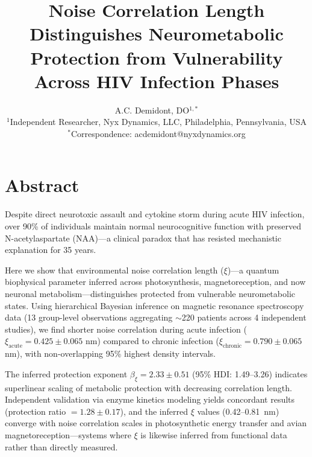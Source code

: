 \documentclass[10pt,a4paper]{article}
\makeatletter
\renewcommand{\maketitle}{
  \begin{center}
    {\LARGE\bfseries\@title\par}
    \vspace{1em}
    {\large\@author\par}
    \vspace{0.5em}
    {\small\@date\par}
  \end{center}
  \vspace{1em}
}
\makeatother
\begin{document}
\title{Noise Correlation Length Distinguishes Neurometabolic Protection from Vulnerability Across HIV Infection Phases}

\author{
A.C. Demidont, DO$^{1,*}$\\[0.5em]
{\small $^1$Independent Researcher, Nyx Dynamics, LLC, Philadelphia, Pennsylvania, USA}\\
{\small $^*$Correspondence: acdemidont@nyxdynamics.org}
}

\date{}

\maketitle

\section*{Abstract}

Despite direct neurotoxic assault and cytokine storm during acute HIV infection, over 90\% of individuals maintain normal neurocognitive function with preserved N-acetylaspartate (NAA)---a clinical paradox that has resisted mechanistic explanation for 35 years.

Here we show that environmental noise correlation length ($\xi$)---a quantum biophysical parameter inferred across photosynthesis, magnetoreception, and now neuronal metabolism---distinguishes protected from vulnerable neurometabolic states. Using hierarchical Bayesian inference on magnetic resonance spectroscopy data (13 group-level observations aggregating $\sim$220 patients across 4 independent studies), we find shorter noise correlation during acute infection ($\xi_{\text{acute}} = 0.425 \pm 0.065$ nm) compared to chronic infection ($\xi_{\text{chronic}} = 0.790 \pm 0.065$ nm), with non-overlapping 95\% highest density intervals.

The inferred protection exponent $\beta_\xi = 2.33 \pm 0.51$ (95\% HDI: 1.49--3.26) indicates superlinear scaling of metabolic protection with decreasing correlation length. Independent validation via enzyme kinetics modeling yields concordant results (protection ratio $= 1.28 \pm 0.17$), and the inferred $\xi$ values (0.42--0.81~nm) converge with noise correlation scales in photosynthetic energy transfer and avian magnetoreception---systems where $\xi$ is likewise inferred from functional data rather than directly measured.
\end{document}
